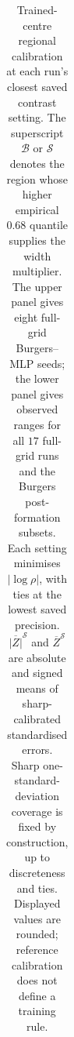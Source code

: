 \begin{table}[!tb]
\begin{tabular}{@{}lrrrrrr@{}}
\bottomrule
\end{tabular}
\caption{Trained-centre regional calibration at each run's closest saved contrast setting.
The superscript $\mathcal B$ or $\mathcal S$ denotes the region whose higher empirical
$0.68$ quantile supplies the width multiplier. The upper panel gives eight full-grid
Burgers--MLP seeds; the lower panel gives observed ranges for all $17$ full-grid runs
and the Burgers post-formation subsets. Each setting minimises $|\log\rho|$, with ties
at the lowest saved precision. $\overline{|Z|}^{\mathcal S}$ and $\overline Z^{\mathcal S}$
are absolute and signed means of sharp-calibrated standardised errors.
Sharp one-standard-deviation coverage is fixed by construction, up to discreteness
and ties. Displayed values are rounded; reference calibration does not define a training rule.}
\label{tab:r4-oracles}
\end{table}
